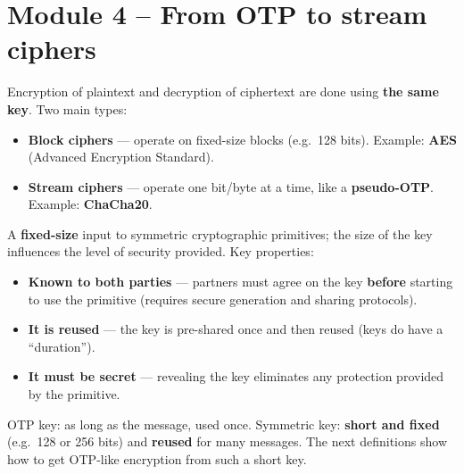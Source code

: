 \section{Module 4 -- From OTP to stream ciphers}

\begin{defnbox}[title=Symmetric encryption]
Encryption of plaintext and decryption of ciphertext are done using \textbf{the same
key}. Two main types:
\begin{itemize}
  \item \textbf{Block ciphers} --- operate on fixed-size blocks (e.g.\ 128 bits).
        Example: \textbf{AES} (Advanced Encryption Standard).
  \item \textbf{Stream ciphers} --- operate one bit/byte at a time, like a
        \textbf{pseudo-OTP}. Example: \textbf{ChaCha20}.
\end{itemize}
\end{defnbox}

\begin{defnbox}[title=Symmetric cryptographic key]
A \textbf{fixed-size} input to symmetric cryptographic primitives; the size of the key
influences the level of security provided. Key properties:
\begin{itemize}
  \item \textbf{Known to both parties} --- partners must agree on the key
        \textbf{before} starting to use the primitive (requires secure generation and
        sharing protocols).
  \item \textbf{It is reused} --- the key is pre-shared once and then reused (keys do
        have a ``duration'').
  \item \textbf{It must be secret} --- revealing the key eliminates any protection
        provided by the primitive.
\end{itemize}
\end{defnbox}

\begin{rembox}[title=Difference with the OTP]
OTP key: as long as the message, used once. Symmetric key: \textbf{short and fixed}
(e.g.\ 128 or 256 bits) and \textbf{reused} for many messages. The next definitions show
how to get OTP-like encryption from such a short key.
\end{rembox}

